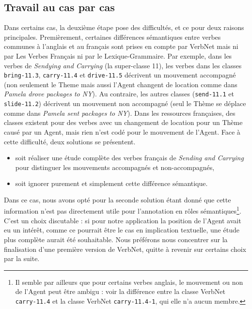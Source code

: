 \subsection{Travail au cas par cas}\label{casebycase}

Dans certains cas, la deuxième étape pose des difficultés, et ce pour deux
raisons principales. Premièrement, certaines différences sémantiques entre
verbes communes à l'anglais et au français sont prises en compte par VerbNet
mais ni par Les Verbes Français ni par le Lexique-Grammaire. Par exemple, dans
les verbes de \textit{Sendying and Carrying} (la super-classe 11), les verbes
dans les classes {\color{blue}\texttt{bring-11.3}},
{\color{blue}\texttt{carry-11.4}} et {\color{blue}\texttt{drive-11.5}}
décrivent un mouvement accompagné (non seulement le Theme mais aussi l'Agent
changent de location comme dans \textit{Pamela drove packages to NY}). Au
contraire, les autres classes ({\color{blue}\texttt{send-11.1}} et
{\color{blue}\texttt{slide-11.2}}) décrivent un mouvement non accompagné (seul
le Thème se déplace comme dans \textit{Pamela sent packages to NY}). Dans les
ressources françaises, des classes existent pour des verbes avec un changement
de location pour un Thème causé par un Agent, mais rien n'est codé pour le
mouvement de l'Agent. Face à cette difficulté, deux solutions se présentent.

\begin{itemize}
    \item soit réaliser une étude complète des verbes français de \textit{Sending
        and Carrying} pour distinguer les mouvements accompagnés et
        non-accompagnés,
    \item soit ignorer purement et simplement cette différence sémantique.
\end{itemize}

Dans ce cas, nous avons opté pour la seconde solution étant donné que cette
information n'est pas directement utile pour l'annotation en rôles
sémantiques\footnote{Il semble par ailleurs que pour certains verbes anglais,
    le mouvement ou non de l'Agent peut être ambigu : voir la différence entre
la classe VerbNet {\color{blue}\texttt{carry-11.4}} et la classe VerbNet
{\color{blue}\texttt{carry-11.4-1}}, qui elle n'a aucun membre.}.  C'est un
choix discutable : si pour notre application la position de l'Agent avait eu un
intérêt, comme ce pourrait être le cas en implication textuelle, une étude plus
complète aurait été souhaitable. Nous préférons nous concentrer sur la
finalisation d'une première version de VerbNet, quitte à revenir sur certains
choix par la suite.

